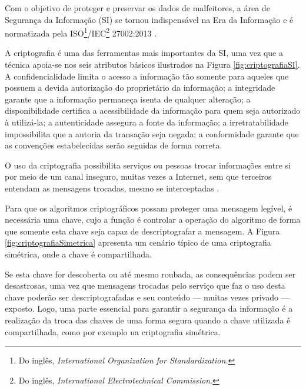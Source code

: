 \documentclass[a4paper,10pt,oneside,conference,final,keeplastbox]{inatel}
\newcommand{\internet}{Internet\xspace}
\begin{document}
        Com o objetivo de proteger e preservar os dados de malfeitores, a área de Segurança da Informação (SI) se tornou indispensável na Era da Informação e é normatizada pela ISO\footnote{Do inglês, \textit{International Organization for Standardization.}}/IEC\footnote{Do inglês, \textit{International Electrotechnical Commission}.} 27002:2013 \cite{iso2013si}.
    
        A criptografia é uma das ferramentas mais importantes da SI, uma vez que a técnica apoia-se nos seis atributos básicos ilustrados na Figura \ref{fig:criptografiaSI}. A confidencialidade limita o acesso a informação tão somente para aqueles que possuem a devida autorização do proprietário da informação; a integridade garante que a informação permaneça isenta de qualquer alteração; a disponibilidade certifica a acessibilidade da informação para quem seja autorizado à utilizá-la; a autenticidade assegura a fonte da informação; a irretratabilidade impossibilita que a autoria da transação seja negada; a conformidade garante que as convenções estabelecidas serão seguidas de forma correta.
    
        
    
        O uso da criptografia possibilita serviços  ou pessoas trocar informações entre si por meio de um canal inseguro, muitas vezes a \internet, sem que terceiros entendam as mensagens trocadas, mesmo se interceptadas \cite{stinson2006cryptography}.
    
        Para que os algoritmos criptográficos possam proteger uma mensagem legível, é necessária uma chave, cujo a função é controlar a operação do algoritmo de forma que somente esta chave seja capaz de descriptografar a mensagem. A Figura \ref{fig:criptografiaSimetrica} apresenta um cenário típico de uma criptografia simétrica, onde a chave é compartilhada.
    
        

        Se esta chave for descoberta ou até mesmo roubada, as consequências podem ser desastrosas, uma vez que mensagens trocadas pelo serviço que faz o uso desta chave poderão ser descriptografadas e seu conteúdo --- muitas vezes privado --- exposto. Logo, uma parte essencial para garantir a segurança da informação é a realização da troca das chaves de uma forma segura quando a chave utilizada é compartilhada, como por exemplo na criptografia simétrica.
    
\end{document}
